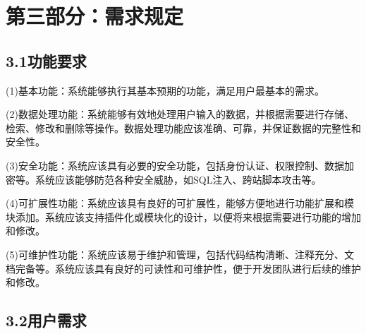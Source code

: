 \documentclass[24pt,a4paper]{article}%
\begin{document}
\section*{\songti 第三部分：需求规定}

\subsection*{\songti 3.1功能要求}
\noindent (1)基本功能：系统能够执行其基本预期的功能，满足用户最基本的需求。 \par
\noindent (2)数据处理功能：系统能够有效地处理用户输入的数据，并根据需要进行存储、检索、修改和删除等操作。数据处理功能应该准确、可靠，并保证数据的完整性和安全性。\par
\noindent (3)安全功能：系统应该具有必要的安全功能，包括身份认证、权限控制、数据加密等。系统应该能够防范各种安全威胁，如SQL注入、跨站脚本攻击等。\par
\noindent (4)可扩展性功能：系统应该具有良好的可扩展性，能够方便地进行功能扩展和模块添加。系统应该支持插件化或模块化的设计，以便将来根据需要进行功能的增加和修改。\par
\noindent (5)可维护性功能：系统应该易于维护和管理，包括代码结构清晰、注释充分、文档完备等。系统应该具有良好的可读性和可维护性，便于开发团队进行后续的维护和修改。

\subsection*{\songti 3.2用户需求}
\end{document}
